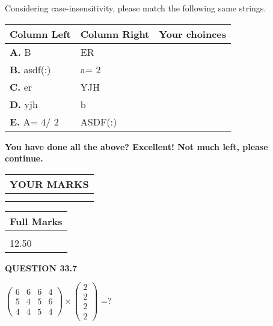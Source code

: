 \documentclass[12pt]{article}
\begin{document}
  
Considering case-insensitivity, please match the following same strings.
  
  
\begin{tabular}{|l|l|l|}
 \hline
 Column Left & Column Right  & Your choinces \\ 
 \hline
{\textbf{\large{
A.}}}
B
  & 
ER
 & 
 \\ 
 \hline
{\textbf{\large{
B.}}}
asdf(:)
  & 
 a= %
2
 & 
 \\ 
 \hline
{\textbf{\large{
C.}}}
er
  & 
YJH
 & 
 \\ 
 \hline
{\textbf{\large{
D.}}}
yjh
  & 
b
 & 
 \\ 
 \hline
{\textbf{\large{
E.}}}
 A= %
4/ %
2

  & 
ASDF(:)
 & 
 \\ 
 \hline
 \end{tabular}
  
  
 
   
   
\vspace{0.3in}
{\textbf{\LARGE{You have done all the above? Excellent! Not much left, please continue.}}}
\vspace{0.3in}
   
   
  
\vspace{0.2in}
  
\noindent\begin{tabular}{|l|}
\hline
 YOUR MARKS  \\
\hline
 \\ 
 \\ 
\hline
\end{tabular}
\hspace{0.05in} \begin{tabular}{|l|}
\hline
 Full Marks  \\
\hline
 \\ 
12.50 \\
\hline
\end{tabular}
{\textbf{\Large{QUESTION
33.7 
}}}
  
  
 
$ \left( \begin{array}{ccccccccc}
           6 & 
           6 & 
           6 & 
           4 \\ 
           5 & 
           4 & 
           5 & 
           6 \\ 
           4 & 
           4 & 
           5 & 
           4
\end{array}\right) \times
\left( \begin{array}{c}
           2 \\ 
           2 \\ 
           2 \\ 
           2
\end{array}\right) $ =?
 
\end{document}
